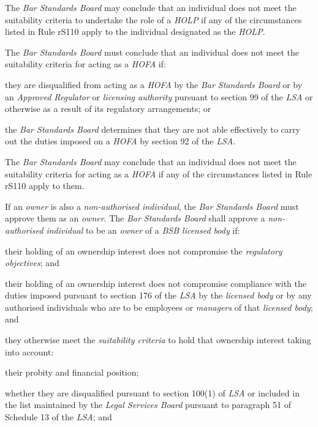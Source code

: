 The \emph{Bar Standards Board} may conclude that an individual does not
meet the suitability criteria to undertake the role of a \emph{HOLP} if
any of the circumstances listed in Rule rS110 apply to the individual
designated as the \emph{HOLP}.


The \emph{Bar Standards Board} must conclude that an individual does not
meet the suitability criteria for acting as a \emph{HOFA} if:\nl\item they are disqualified from acting as a \emph{HOFA} by the \emph{Bar
Standards Board} or by an \emph{Approved Regulator} or \emph{licensing
authority} pursuant to section 99 of the \emph{LSA} or otherwise as a
result of its regulatory arrangements; or
\item the \emph{Bar Standards Board} determines that they are not able
effectively to carry out the duties imposed on a \emph{HOFA} by section
92 of the \emph{LSA}.
\ln
{}

The \emph{Bar Standards Board} may conclude that an individual does not
meet the suitability criteria for acting as a \emph{HOFA} if any of the
circumstances listed in Rule rS110 apply to them.


If an \emph{owner} is also a \emph{non-authorised individual}, the
\emph{Bar Standards Board} must approve them as an \emph{owner}. The
\emph{Bar Standards Board} shall approve a \emph{non-authorised
individual} to be an \emph{owner} of a \emph{BSB licensed body} if:\nl\item their holding of an ownership interest does not compromise the
\emph{regulatory objectives}; and
\item their holding of an ownership interest does not compromise compliance
with the duties imposed pursuant to section 176 of the \emph{LSA} by the
\emph{licensed body} or by any authorised individuals who are to be
employees or \emph{managers} of that \emph{licensed body}; and
\item they otherwise meet the \emph{suitability criteria} to hold that
ownership interest taking into account:
\al
\item their probity and financial position;

\item  whether they are disqualified pursuant to section 100(1) of
\emph{LSA} or included in the list maintained by the \emph{Legal
Services Board} pursuant to paragraph 51 of Schedule 13 of the
\emph{LSA}; and

